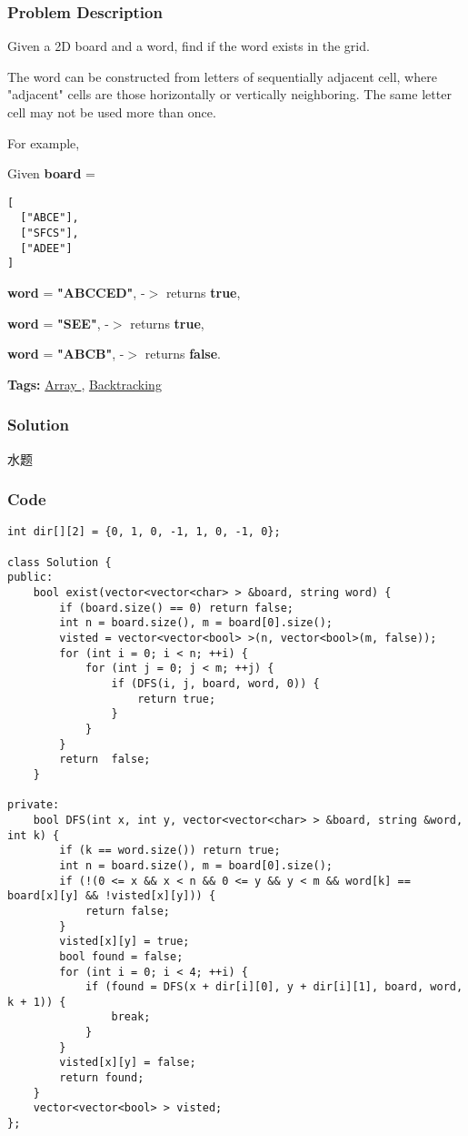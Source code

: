 \documentclass{article}
\begin{document}
\begin{CJK*}{UTF8}{gkai}
\subsubsection*{Problem Description}
Given a 2D board and a word, find if the word exists in the grid.

The word can be constructed from letters of sequentially adjacent cell, where "adjacent" cells are those horizontally or vertically neighboring. The same letter cell may not be used more than once.

For example,


Given \textbf{board} = 
\begin{verbatim}
[
  ["ABCE"],
  ["SFCS"],
  ["ADEE"]
]
\end{verbatim}

\textbf{word} = \textbf{"ABCCED"}, -$>$ returns \textbf{true},


\textbf{word} = \textbf{"SEE"}, -$>$ returns \textbf{true},


\textbf{word} = \textbf{"ABCB"}, -$>$ returns \textbf{false}.


\textbf{Tags: }
\hyperref[ Array ]{ Array },  \hyperref[ Backtracking ]{ Backtracking }



\subsubsection*{Solution}
水题

\subsubsection*{Code}
\begin{lstlisting}
int dir[][2] = {0, 1, 0, -1, 1, 0, -1, 0};

class Solution {
public:
    bool exist(vector<vector<char> > &board, string word) {
        if (board.size() == 0) return false;
        int n = board.size(), m = board[0].size();
        visted = vector<vector<bool> >(n, vector<bool>(m, false));
        for (int i = 0; i < n; ++i) {
            for (int j = 0; j < m; ++j) {
                if (DFS(i, j, board, word, 0)) {
                    return true;
                }
            }
        }
        return  false;
    }
    
private:
    bool DFS(int x, int y, vector<vector<char> > &board, string &word, int k) {
        if (k == word.size()) return true;
        int n = board.size(), m = board[0].size();
        if (!(0 <= x && x < n && 0 <= y && y < m && word[k] == board[x][y] && !visted[x][y])) {
            return false;
        }
        visted[x][y] = true;
        bool found = false;
        for (int i = 0; i < 4; ++i) {
            if (found = DFS(x + dir[i][0], y + dir[i][1], board, word, k + 1)) {
                break;
            }
        }
        visted[x][y] = false;
        return found;
    }
    vector<vector<bool> > visted;
}; 
\end{lstlisting}



\end{CJK*}
\end{document}
